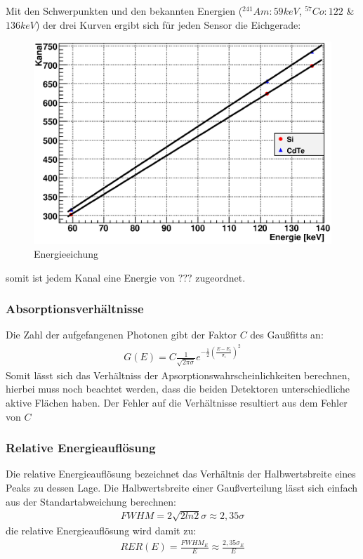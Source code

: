 \documentclass[12pt]{article}
\begin{document}
Mit den Schwerpunkten und den bekannten Energien ($^{241}Am:59keV$, $^{57}Co:122$ \& $136keV$) der drei Kurven ergibt sich für jeden Sensor die Eichgerade:
\begin{figure}[H]
\centering
\includegraphics[width=0.9\linewidth]{../plot/eps/gamma/finalfit.eps}
\caption{Energieeichung}
\end{figure}
somit ist jedem Kanal eine Energie von $???$ zugeordnet.

\subsubsection{Absorptionsverhältnisse}
Die Zahl der aufgefangenen Photonen gibt der Faktor $C$ des Gaußfitts an:
\begin{align*}
 G(E) = C \frac{1}{\sqrt{2 \pi \sigma}} e^{-\frac{1}{2}\left(\frac{E-E_i}{\sigma_i}\right)^2}
\end{align*}
Somit lässt sich das Verhältniss der Apsorptionswahrscheinlichkeiten berechnen, hierbei muss noch beachtet werden, dass die beiden Detektoren unterschiedliche aktive Flächen haben. Der Fehler auf die Verhältnisse resultiert aus dem Fehler von $C$


\subsubsection{Relative Energieauflösung}
Die relative Energieauflösung bezeichnet das Verhältnis der Halbwertsbreite
eines Peaks zu dessen Lage. Die Halbwertsbreite einer Gaußverteilung lässt sich einfach aus der Standartabweichung berechnen:
\begin{align*}
 FWHM = 2\sqrt{2 ln 2} \sigma \approx 2,35\sigma
\end{align*}
die relative Energieauflösung wird damit zu:
\begin{align*}
 RER(E) = \frac{FWHM_E}{E} \approx \frac{2,35\sigma_E}{E}
\end{align*}
\end{document}
